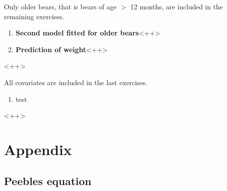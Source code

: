 \documentclass[a4paper,11pt]{article}
\begin{document}
Only older bears, that is bears of age $>$ 12 months, are included in the remaining exercises.

\begin{enumerate}[resume*]
    \item \textbf{Second model fitted for older bears}<++>
    
    \item \textbf{Prediction of weight}<++>
\end{enumerate}<++>

All covariates are included in the last exercises.

\begin{enumerate}[resume*]
    \item test
\end{enumerate}<++>



%
%

\clearpage
\appendix
\section{Appendix}
\label{sec:appendix}

\subsection{Peebles equation}
\label{app:peebles}

%
\end{document}
